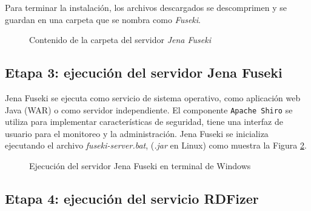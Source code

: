 Para terminar la instalaci\'on, los archivos descargados se descomprimen y se guardan en una carpeta que se nombra como \textit{Fuseki}. 

\begin{figure}[!ht]
	\centering
    \caption{Contenido de la carpeta del servidor \textit{Jena Fuseki}}
    \label{opcionesDescargaFuseki}
\end{figure}

\subsection{Etapa 3: ejecuci\'on del servidor Jena Fuseki}

Jena Fuseki se ejecuta como servicio de sistema operativo, como aplicaci\'on web Java (WAR) o como servidor independiente. El componente \texttt{Apache Shiro} se utiliza para implementar caracter\'isticas de seguridad, tiene una interfaz de usuario para el monitoreo y la administraci\'on. Jena Fuseki se inicializa ejecutando el archivo \textit{fuseki-server.bat}, (\textit{.jar} en Linux) como muestra la Figura \ref{ejecucionFuseki}.

\begin{figure}[!ht]
	\centering
    \caption{Ejecuci\'on del servidor Jena Fuseki en terminal de Windows}
    \label{ejecucionFuseki}
\end{figure}

\subsection{Etapa 4: ejecuci\'on del servicio RDFizer}

